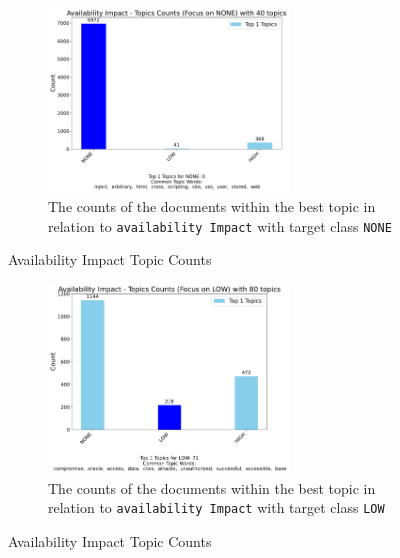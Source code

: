 \documentclass[12pt]{article}
\begin{document}
\begin{figure}[h!]
	\ContinuedFloat*
	\centering
	\begin{subfigure}{\textwidth}
		\centering
		\includegraphics[width=0.7\textwidth]{figures/availabilityImpact/merged_top_k_topics_category_focus_counts_availabilityImpact_NONE_k1.pdf}

		\caption{The counts of the documents within the best topic in relation to \texttt{availability
				Impact} with
			target class \texttt{NONE}}
	\end{subfigure}


	\caption{Availability Impact Topic Counts}
	\label{fig:availabilityImpact_60_NONE}
\end{figure}

\begin{figure}[h!]
	\ContinuedFloat
	\centering
	\begin{subfigure}{\textwidth}
		\centering
		\includegraphics[width=0.7\textwidth]{figures/availabilityImpact/merged_top_k_topics_category_focus_counts_availabilityImpact_LOW_k1.pdf}
		\caption{The counts of the documents within the best topic in relation to \texttt{availability Impact} with target class \texttt{LOW}}
		\label{fig:availabilityImpact_60_LOW}
	\end{subfigure}

	\caption{Availability Impact Topic Counts}
\end{figure}
\end{document}
